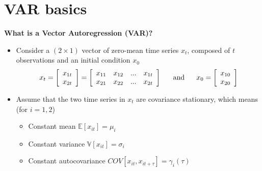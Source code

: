 \documentclass[10pt,english,t,aspectratio=169,ignorenonframetext]{beamer}
\begin{document}

\section{VAR basics}

\begin{frame}
\vspace{3cm}\color{title} 
\end{frame}


\begin{frame}
{\textbf{What is a Vector Autoregression (VAR)?}}

\begin{itemize}
\item Consider a $(2\times 1)$ vector of zero-mean time series $x_{t}$,
composed of $t$ observations and an initial condition $x_{0}$%
\begin{equation*}
x_{t}=\left[ 
\begin{array}{c}
x_{1t} \\ 
x_{2t}%
\end{array}%
\right] =\left[ 
\begin{array}{cccc}
x_{11} & x_{12} & ... & x_{1t} \\ 
x_{21} & x_{22} & ... & x_{2t}%
\end{array}%
\right]
\ \ \ \ \ \text{\color{black}and} \ \ \ \ \ 
x_{0}=\left[ 
\begin{array}{c}
x_{10} \\ 
x_{20}%
\end{array}%
\right]
\end{equation*}%
\pause\medskip

\item Assume that the two time series in $x_t$ are covariance stationary,
which means (for $i=1,2$)\smallskip

\begin{itemize}
\item Constant mean $\mathbb{E}[x_{it}]=\mu_{i}$\medskip

\item Constant variance $\mathbb{V}[x_{it}]=\sigma_{i}$\medskip

\item Constant autocovariance $COV[x_{it},x_{it+\tau}]=\gamma_{i}(\tau)$
\end{itemize}

\pause\bigskip


\end{itemize}
\end{frame}
\end{document}
